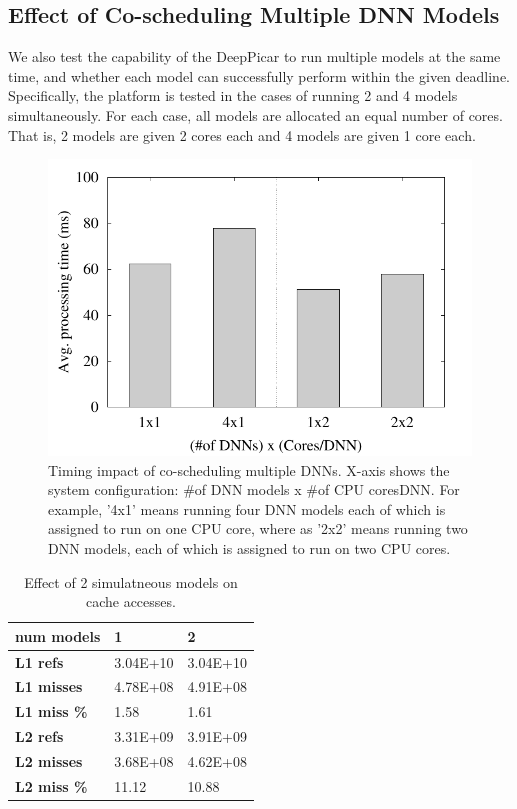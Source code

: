 \subsection{Effect of Co-scheduling Multiple DNN Models}

We also test the capability of the DeepPicar to run multiple models at
the same time, and whether each model can successfully perform within
the given deadline. Specifically, the platform is tested in the cases
of running 2 and 4 models simultaneously. For each case, all models
are allocated an equal number of cores. That is, 2 models are given 2
cores each and 4 models are given 1 core each.

\begin{figure}[h]
  \centering
  \includegraphics[width=.45\textwidth]{figs/perf_vs_modelcnt}
  \caption{Timing impact of co-scheduling multiple DNNs. X-axis shows
    the system configuration: \#of DNN models x \#of CPU cores\/DNN. For
    example, '4x1' means running four DNN models each of which is
    assigned to run on one CPU core, where as '2x2' means running two DNN
    models, each of which is assigned to run on two CPU cores.}
  \label{fig:perf-vs-multimodel}
\end{figure}


\begin{table}[h]
\centering
  \begin{tabular} {| l | l | l |}
  \hline
  \textbf{num models} & 1 & 2 \\ \hline
  \textbf{L1 refs} &  3.04E+10 &  3.04E+10 \\ \hline
  \textbf{L1 misses} & 4.78E+08 & 4.91E+08 \\ \hline
  \textbf{L1 miss \%} & 1.58 & 1.61 \\ \hline
  \textbf{L2 refs} & 3.31E+09 &  3.91E+09 \\ \hline
  \textbf{L2 misses} & 3.68E+08 & 4.62E+08 \\ \hline
  \textbf{L2 miss \%} & 11.12 & 10.88 \\ \hline
  \end{tabular}
  \caption{ Effect of 2 simulatneous models on cache accesses. }
\end{table}

